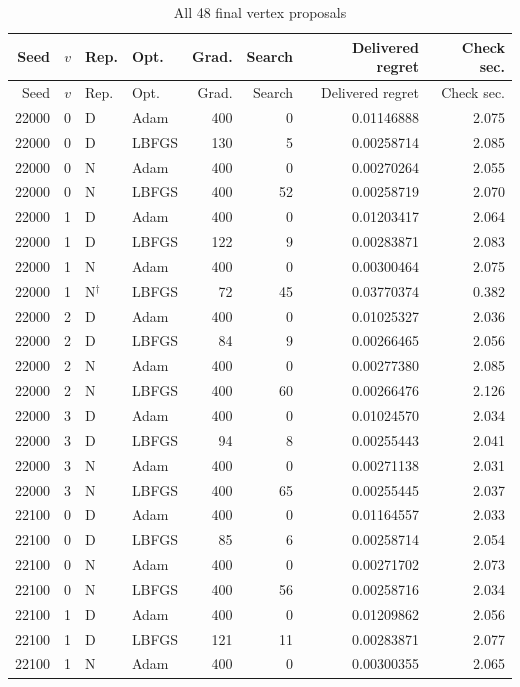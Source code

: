 \small\begin{longtable}{rrllrrrr}
\caption{All 48 final vertex proposals}\label{tab:r22ledger}\\
\toprule
Seed & $v$ & Rep. & Opt. & Grad. & Search & Delivered regret & Check sec.\\\midrule\endfirsthead
\toprule
Seed & $v$ & Rep. & Opt. & Grad. & Search & Delivered regret & Check sec.\\\midrule\endhead
22000 & 0 & D & Adam & 400 & 0 & 0.01146888 & 2.075\\
22000 & 0 & D & LBFGS & 130 & 5 & 0.00258714 & 2.085\\
22000 & 0 & N & Adam & 400 & 0 & 0.00270264 & 2.055\\
22000 & 0 & N & LBFGS & 400 & 52 & 0.00258719 & 2.070\\
22000 & 1 & D & Adam & 400 & 0 & 0.01203417 & 2.064\\
22000 & 1 & D & LBFGS & 122 & 9 & 0.00283871 & 2.083\\
22000 & 1 & N & Adam & 400 & 0 & 0.00300464 & 2.075\\
22000 & 1 & N$^{\dagger}$ & LBFGS & 72 & 45 & 0.03770374 & 0.382\\
22000 & 2 & D & Adam & 400 & 0 & 0.01025327 & 2.036\\
22000 & 2 & D & LBFGS & 84 & 9 & 0.00266465 & 2.056\\
22000 & 2 & N & Adam & 400 & 0 & 0.00277380 & 2.085\\
22000 & 2 & N & LBFGS & 400 & 60 & 0.00266476 & 2.126\\
22000 & 3 & D & Adam & 400 & 0 & 0.01024570 & 2.034\\
22000 & 3 & D & LBFGS & 94 & 8 & 0.00255443 & 2.041\\
22000 & 3 & N & Adam & 400 & 0 & 0.00271138 & 2.031\\
22000 & 3 & N & LBFGS & 400 & 65 & 0.00255445 & 2.037\\
22100 & 0 & D & Adam & 400 & 0 & 0.01164557 & 2.033\\
22100 & 0 & D & LBFGS & 85 & 6 & 0.00258714 & 2.054\\
22100 & 0 & N & Adam & 400 & 0 & 0.00271702 & 2.073\\
22100 & 0 & N & LBFGS & 400 & 56 & 0.00258716 & 2.034\\
22100 & 1 & D & Adam & 400 & 0 & 0.01209862 & 2.056\\
22100 & 1 & D & LBFGS & 121 & 11 & 0.00283871 & 2.077\\
22100 & 1 & N & Adam & 400 & 0 & 0.00300355 & 2.065\\

\end{longtable}
